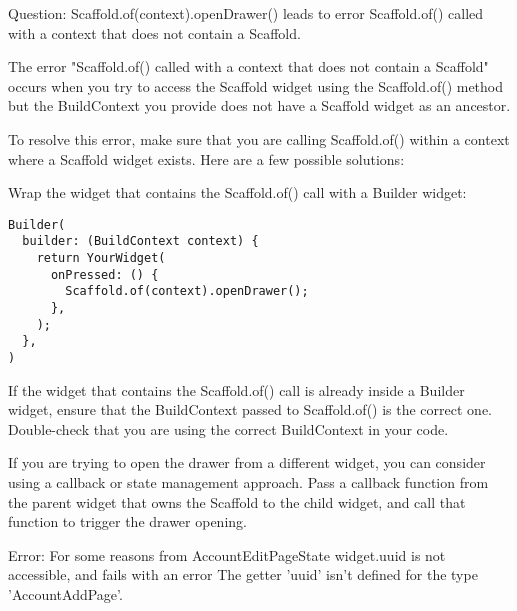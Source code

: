 Question: Scaffold.of(context).openDrawer() leads to error Scaffold.of() called with a context that does 
not contain a Scaffold.

The error "Scaffold.of() called with a context that does not contain a Scaffold" occurs when you try to access 
the Scaffold widget using the Scaffold.of() method but the BuildContext you provide does not have a Scaffold 
widget as an ancestor.

To resolve this error, make sure that you are calling Scaffold.of() within a context where a Scaffold widget 
exists. Here are a few possible solutions:

Wrap the widget that contains the Scaffold.of() call with a Builder widget:

\begin{lstlisting}
Builder(
  builder: (BuildContext context) {
    return YourWidget(
      onPressed: () {
        Scaffold.of(context).openDrawer();
      },
    );
  },
)
\end{lstlisting}

If the widget that contains the Scaffold.of() call is already inside a Builder widget, ensure that the BuildContext 
passed to Scaffold.of() is the correct one. Double-check that you are using the correct BuildContext in your code.

If you are trying to open the drawer from a different widget, you can consider using a callback or state management 
approach. Pass a callback function from the parent widget that owns the Scaffold to the child widget, and call that 
function to trigger the drawer opening.




Error: For some reasons from AccountEditPageState widget.uuid is not accessible, and fails with an error The getter 
'uuid' isn't defined for the type 'AccountAddPage'.

